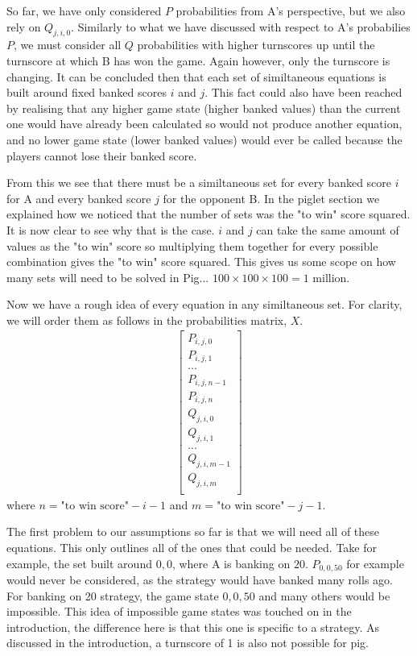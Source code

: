 \documentclass[a4paper,titlepage]{article}
\begin{document}
So far, we have only considered $P$ probabilities from A's perspective, but we also rely on $Q_{j,i,0}$. Similarly to what we have discussed with respect to A's probabilies $P$, we must consider all $Q$ probabilities with higher turnscores up until the turnscore at which B has won the game. Again however, only the turnscore is changing. It can be concluded then that each set of similtaneous equations is built around fixed banked scores $i$ and $j$. This fact could also have been reached by realising that any higher game state (higher banked values) than the current one would have already been calculated so would not produce another equation, and no lower game state (lower banked values) would ever be called because the players cannot lose their banked score.


From this %
we see that there must be a similtaneous set for every banked score $i$ for A and every banked score $j$ for the opponent B. In the piglet section we explained how we noticed that the number of sets was the "to win" score squared. It is now clear to see why that is the case. $i$ and $j$ can take the same amount of values as the "to win" score so multiplying them together for every possible combination gives the "to win" score squared. This gives us some scope on how many sets will need to be solved in Pig... $100\times100\times100=1$ million.

Now we have a rough idea of every equation in any similtaneous set. For clarity, we will order them as follows in the probabilities matrix, $X$.
\begin{align}
	\begin{bmatrix}
		P_{i,j,0}\\
		P_{i,j,1}\\
		...\\
		P_{i,j,n-1}\\
		P_{i,j,n}\\
		Q_{j,i,0}\\
		Q_{j,i,1}\\
		...\\
		Q_{j,i,m-1}\\
		Q_{j,i,m}\\
	\end{bmatrix}
\end{align}
where $n=\text{"to win score"}-i-1$ and $m=\text{"to win score"}-j-1$.

The first problem to our assumptions so far is that we will need all of these equations. This only outlines all of the ones that could be needed. Take for example, the set built around $0,0$, where A is banking on $20$. $P_{0,0,50}$ for example would never be considered, as the strategy would have banked many rolls ago. For banking on 20 strategy, the game state $0,0,50$ and many others would be impossible. This idea of impossible game states was touched on in the introduction, the difference here is that this one is specific to a strategy. As discussed in the introduction, a turnscore of 1 is also not possible for pig.
\end{document}

